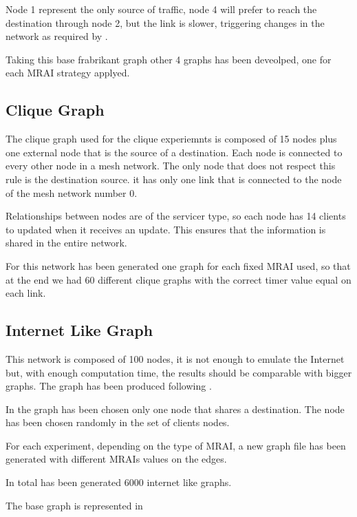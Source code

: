 \documentclass[10pt,conference,letterpaper]{IEEEtran}
\begin{document}
Node 1 represent the only source of traffic, node 4 will prefer to reach the 
destination through node 2, but the link is slower, triggering changes in the
network as required by \cite{fabrikant}.

Taking this base frabrikant graph other 4 graphs has been deveolped, one for each
\ac{MRAI} strategy applyed.

\subsection{Clique Graph}
\label{subsec:clique_graph}

The clique graph used for the clique experiemnts is composed of \num{15} nodes
plus one external node that is the source of a destination.
Each node is connected to every other node in a mesh network. The only node that
does not respect this rule is the destination source. it has only one link 
that is connected to the node of the mesh network number \num{0}.

Relationships between nodes are of the servicer type, so each node has \num{14}
clients to updated when it receives an update.
This ensures that the information is shared in the entire network.

For this network has been generated one graph for each fixed \ac{MRAI} used, so
that at the end we had \num{60} different clique graphs with the correct timer value
equal on each link.

\subsection{Internet Like Graph}
\label{subsec:internet_graph}

This network is composed of \num{100} nodes, it is not enough to emulate the Internet
but, with enough computation time, the results should be comparable with bigger graphs.
The graph has been produced following \cite{elmokashfi}.

In the graph has been chosen only one node that shares a destination.
The node has been chosen randomly in the set of clients nodes.

For each experiment, depending on the type of \ac{MRAI}, a new graph file has
been generated with different MRAIs values on the edges.

In total has been generated \num{6000} internet like graphs.

The base graph is represented in 
\end{document}

